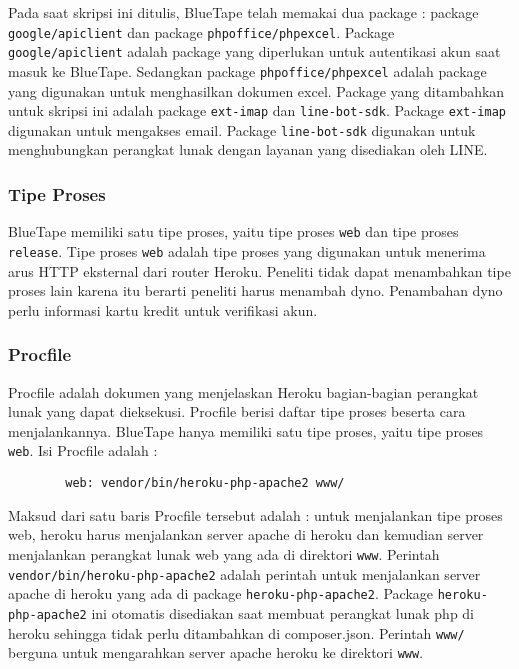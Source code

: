 		Pada saat skripsi ini ditulis, BlueTape telah memakai dua package : package \texttt{google/apiclient} dan package \texttt{phpoffice/phpexcel}. Package \texttt{google/apiclient} adalah package yang diperlukan untuk autentikasi akun saat masuk ke BlueTape. Sedangkan package \texttt{phpoffice/phpexcel} adalah package yang digunakan untuk menghasilkan dokumen excel. Package yang ditambahkan untuk skripsi ini adalah package \texttt{ext-imap} dan \texttt{line-bot-sdk}. Package \texttt{ext-imap} digunakan untuk mengakses email. Package \texttt{line-bot-sdk} digunakan untuk menghubungkan perangkat lunak dengan layanan yang disediakan oleh LINE.
		
	\subsubsection{Tipe Proses}
		BlueTape memiliki satu tipe proses, yaitu tipe proses \texttt{web} dan tipe proses \texttt{release}. Tipe proses \texttt{web} adalah tipe proses yang digunakan untuk menerima arus HTTP eksternal dari router Heroku. Peneliti tidak dapat menambahkan tipe proses lain karena itu berarti peneliti harus menambah dyno. Penambahan dyno perlu informasi kartu kredit untuk verifikasi akun.
		
	\subsubsection{Procfile}
		Procfile adalah dokumen yang menjelaskan Heroku bagian-bagian perangkat lunak yang dapat dieksekusi. Procfile berisi daftar tipe proses beserta cara menjalankannya. BlueTape hanya memiliki satu tipe proses, yaitu tipe proses \texttt{web}. Isi Procfile adalah :
		\begin{lstlisting}
		web: vendor/bin/heroku-php-apache2 www/
		\end{lstlisting}
		
		Maksud dari satu baris Procfile tersebut adalah : untuk menjalankan tipe proses web, heroku harus menjalankan server apache di heroku dan kemudian server menjalankan perangkat lunak web yang ada di direktori \texttt{www}. Perintah \texttt{vendor/bin/heroku-php-apache2} adalah perintah untuk menjalankan server apache di heroku yang ada di package \texttt{heroku-php-apache2}. Package \texttt{heroku-php-apache2} ini otomatis disediakan saat membuat perangkat lunak php di heroku sehingga tidak perlu ditambahkan di composer.json. Perintah \texttt{www/} berguna untuk mengarahkan server apache heroku ke direktori \texttt{www}.
		
